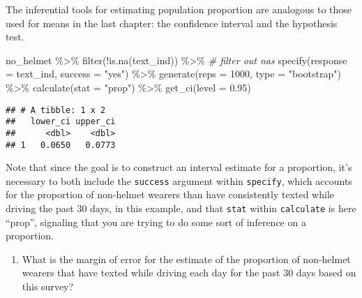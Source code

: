 \documentclass[
]{article}
\newenvironment{Shaded}{\begin{snugshade}}{\end{snugshade}}
\newcommand{\AttributeTok}[1]{\textcolor[rgb]{0.77,0.63,0.00}{#1}}
\newcommand{\CommentTok}[1]{\textcolor[rgb]{0.56,0.35,0.01}{\textit{#1}}}
\newcommand{\DecValTok}[1]{\textcolor[rgb]{0.00,0.00,0.81}{#1}}
\newcommand{\FloatTok}[1]{\textcolor[rgb]{0.00,0.00,0.81}{#1}}
\newcommand{\FunctionTok}[1]{\textcolor[rgb]{0.00,0.00,0.00}{#1}}
\newcommand{\NormalTok}[1]{#1}
\newcommand{\OtherTok}[1]{\textcolor[rgb]{0.56,0.35,0.01}{#1}}
\newcommand{\SpecialCharTok}[1]{\textcolor[rgb]{0.00,0.00,0.00}{#1}}
\newcommand{\StringTok}[1]{\textcolor[rgb]{0.31,0.60,0.02}{#1}}
\providecommand{\tightlist}{%
  \setlength{\itemsep}{0pt}\setlength{\parskip}{0pt}}
\begin{document}
The inferential tools for estimating population proportion are analogous
to those used for means in the last chapter: the confidence interval and
the hypothesis test.

\begin{Shaded}
\begin{Highlighting}[]
\NormalTok{no\_helmet }\SpecialCharTok{\%\textgreater{}\%}
  \FunctionTok{filter}\NormalTok{(}\SpecialCharTok{!}\FunctionTok{is.na}\NormalTok{(text\_ind)) }\SpecialCharTok{\%\textgreater{}\%} \CommentTok{\# filter out na\textquotesingle{}s}
  \FunctionTok{specify}\NormalTok{(}\AttributeTok{response =}\NormalTok{ text\_ind, }\AttributeTok{success =} \StringTok{"yes"}\NormalTok{) }\SpecialCharTok{\%\textgreater{}\%}
  \FunctionTok{generate}\NormalTok{(}\AttributeTok{reps =} \DecValTok{1000}\NormalTok{, }\AttributeTok{type =} \StringTok{"bootstrap"}\NormalTok{) }\SpecialCharTok{\%\textgreater{}\%}
  \FunctionTok{calculate}\NormalTok{(}\AttributeTok{stat =} \StringTok{"prop"}\NormalTok{) }\SpecialCharTok{\%\textgreater{}\%}
  \FunctionTok{get\_ci}\NormalTok{(}\AttributeTok{level =} \FloatTok{0.95}\NormalTok{)}
\end{Highlighting}
\end{Shaded}

\begin{verbatim}
## # A tibble: 1 x 2
##   lower_ci upper_ci
##      <dbl>    <dbl>
## 1   0.0650   0.0773
\end{verbatim}

Note that since the goal is to construct an interval estimate for a
proportion, it's necessary to both include the \texttt{success} argument
within \texttt{specify}, which accounts for the proportion of non-helmet
wearers than have consistently texted while driving the past 30 days, in
this example, and that \texttt{stat} within \texttt{calculate} is here
``prop'', signaling that you are trying to do some sort of inference on
a proportion.

\begin{enumerate}
\def\labelenumi{\arabic{enumi}.}
\setcounter{enumi}{2}
\tightlist
\item
  What is the margin of error for the estimate of the proportion of
  non-helmet wearers that have texted while driving each day for the
  past 30 days based on this survey?
\end{enumerate}

\begin{Shaded}
\end{Shaded}
\end{document}
